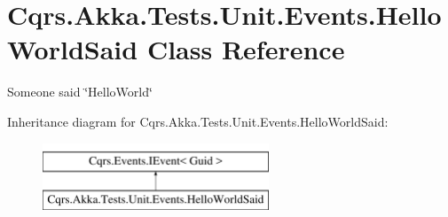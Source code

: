\hypertarget{classCqrs_1_1Akka_1_1Tests_1_1Unit_1_1Events_1_1HelloWorldSaid}{}\section{Cqrs.\+Akka.\+Tests.\+Unit.\+Events.\+Hello\+World\+Said Class Reference}
\label{classCqrs_1_1Akka_1_1Tests_1_1Unit_1_1Events_1_1HelloWorldSaid}


Someone said \char`\"{}\+Hello\+World\char`\"{}  


Inheritance diagram for Cqrs.\+Akka.\+Tests.\+Unit.\+Events.\+Hello\+World\+Said\+:\begin{figure}[H]
\begin{center}
\leavevmode
\includegraphics[height=2.000000cm]{classCqrs_1_1Akka_1_1Tests_1_1Unit_1_1Events_1_1HelloWorldSaid}
\end{center}
\end{figure}

